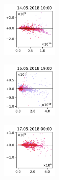 \begin{figure}[H]
    \centering
    \begin{subfigure}
        \centering
        \includegraphics[width=0.30\textwidth,valign=t]{evaluation/figures/perturbations/perturbation-14.05.2018:10.00-sesquiterpenes-div-1.01.pdf}
    \end{subfigure}
    \begin{subfigure}
        \centering
        \includegraphics[width=0.30\textwidth,valign=t]{evaluation/figures/perturbations/perturbation-15.05.2018:19.00-sesquiterpenes-div-1.01.pdf}
    \end{subfigure}
    \begin{subfigure}
        \centering
        \includegraphics[width=0.30\textwidth,valign=t]{evaluation/figures/perturbations/perturbation-17.05.2018:00.00-sesquiterpenes-div-1.01.pdf}
    \end{subfigure}


\end{figure}
